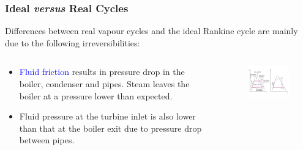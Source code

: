 \documentclass[10pt,compress]{beamer}
\begin{document}
\begin{frame}
 \frametitle{Ideal {\it versus} Real Cycles}
      Differences between real vapour cycles and the ideal Rankine cycle are mainly due to the following irreversibilities: 
  \begin{columns}

   \begin{column}[c]{0.4\linewidth}
      \begin{itemize}%
      \item <1-> \textcolor{blue}{Fluid friction} results in pressure drop in the boiler, condenser and pipes. Steam leaves the boiler at a pressure lower than expected. 
      \item <2-> Fluid pressure at the turbine inlet is also lower than that at the boiler exit due to pressure drop between pipes. 
    \end{itemize}
   \end{column}
   \begin{column}[c]{0.6\linewidth}
    \begin{figure}%
     \begin{center}
      \includegraphics[width=7.5cm,clip]{./Pics/Rankine_vs_Real}
     \end{center}
    \end{figure}  
   \end{column}

  \end{columns}
 \normalsize
\end{frame}
\end{document}
